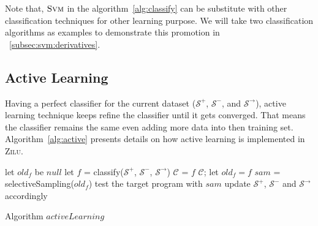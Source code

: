 Note that,
$\textsc{Svm}$ in the algorithm~\ref{alg:classify} can be substitute with other classification techniques for other learning purpose. 
We will take two classification algorithms as examples to demonstrate this promotion in ~\ref{subsec:svm:derivatives}.
 



\subsection{Active Learning} 
\label{subsec:active:learning}
Having a perfect classifier for the current dataset ($\mathcal{S}^+$, $\mathcal{S}^-$, and $\mathcal{S}^\rightarrow$), 
active learning technique keeps refine the classifier until it gets converged.
That means the classifier remains the same even adding more data into then training set. 
Algorithm~\ref{alg:active} presents details on how active learning is implemented in \textsc{Zilu}. 


\begin{algorithm}[t]
\SetAlgoVlined
\Indm
{}
\Indp
let $old_f$ be $null$\;
 {
    let $f$ = classify($\mathcal{S}^+$, $\mathcal{S}^-$, $\mathcal{S}^\rightarrow$)\;
     {
         {
            $\mathcal{C}$ = $f$\;
            \Return $\mathcal{C}$;
        }
        let $old_f = f$\;
    }
    $sam$ = selectiveSampling($old_f$)\;
    test the target program with $sam$\;
    update $\mathcal{S}^+$, $\mathcal{S}^-$ and $\mathcal{S}^\rightarrow$ accordingly\;
}
\caption{Algorithm $activeLearning$}
\label{alg:active}
\end{algorithm}

